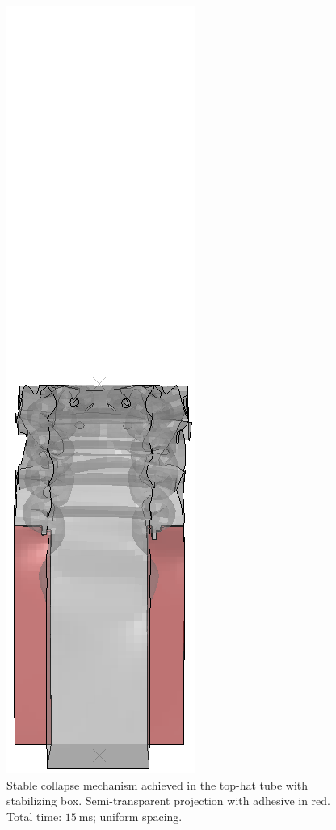 \documentclass[
documentsize = a4, %
font = cmr, %
typesize = 11, %
printmode = true,
onehalfspacing = true,
language = en, %
titlepage = udciccp, %
degree = pt, %
dedication = true,
acknowledgements = true,
abstract-en = true,
abstract-es = false,
abstract-ga = false,
epigraphs = true,
toc = true,
lof = true,
lot = true,
frontmatterintoc = false,
notation = false,
minimal = false,
]{UDCthesis}
\begin{document}
\begin{figure}
\begin{minipage}[b]{.06\linewidth}
	\end{minipage}
	\quad
	\begin{minipage}[b]{.06\linewidth}
		\centering
		\includegraphics[width=\linewidth]{IMG_CUTRES/a10}
	\end{minipage}

	\caption[Stable collapse mechanism achieved in the top-hat tube with stabilizing box.]{Stable collapse mechanism achieved in the top-hat tube with stabilizing box. Semi-transparent projection with adhesive in red. Total time: $\SI{15}{\ms}$; uniform spacing.}
	\label{fig:stable}
\end{figure}
\end{document}
